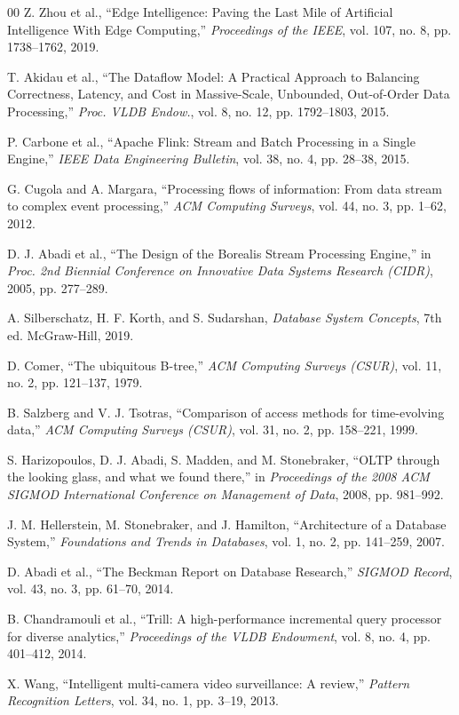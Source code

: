 \documentclass[conference]{IEEEtran}
\begin{document}
\begin{thebibliography}{00}
 Z. Zhou et al., ``Edge Intelligence: Paving the Last Mile of Artificial Intelligence With Edge Computing,'' \textit{Proceedings of the IEEE}, vol. 107, no. 8, pp. 1738--1762, 2019.

 T. Akidau et al., ``The Dataflow Model: A Practical Approach to Balancing Correctness, Latency, and Cost in Massive-Scale, Unbounded, Out-of-Order Data Processing,'' \textit{Proc. VLDB Endow.}, vol. 8, no. 12, pp. 1792--1803, 2015.

 P. Carbone et al., ``Apache Flink: Stream and Batch Processing in a Single Engine,'' \textit{IEEE Data Engineering Bulletin}, vol. 38, no. 4, pp. 28--38, 2015.

 G. Cugola and A. Margara, ``Processing flows of information: From data stream to complex event processing,'' \textit{ACM Computing Surveys}, vol. 44, no. 3, pp. 1--62, 2012.

 D. J. Abadi et al., ``The Design of the Borealis Stream Processing Engine,'' in \textit{Proc. 2nd Biennial Conference on Innovative Data Systems Research (CIDR)}, 2005, pp. 277--289.

 A. Silberschatz, H. F. Korth, and S. Sudarshan, \textit{Database System Concepts}, 7th ed. McGraw-Hill, 2019.

 D. Comer, ``The ubiquitous B-tree,'' \textit{ACM Computing Surveys (CSUR)}, vol. 11, no. 2, pp. 121--137, 1979.

 B. Salzberg and V. J. Tsotras, ``Comparison of access methods for time-evolving data,'' \textit{ACM Computing Surveys (CSUR)}, vol. 31, no. 2, pp. 158--221, 1999.

 S. Harizopoulos, D. J. Abadi, S. Madden, and M. Stonebraker, ``OLTP through the looking glass, and what we found there,'' in \textit{Proceedings of the 2008 ACM SIGMOD International Conference on Management of Data}, 2008, pp. 981--992.

 J. M. Hellerstein, M. Stonebraker, and J. Hamilton, ``Architecture of a Database System,'' \textit{Foundations and Trends in Databases}, vol. 1, no. 2, pp. 141--259, 2007.

 D. Abadi et al., ``The Beckman Report on Database Research,'' \textit{SIGMOD Record}, vol. 43, no. 3, pp. 61--70, 2014.

 B. Chandramouli et al., ``Trill: A high-performance incremental query processor for diverse analytics,'' \textit{Proceedings of the VLDB Endowment}, vol. 8, no. 4, pp. 401--412, 2014.

 X. Wang, ``Intelligent multi-camera video surveillance: A review,'' \textit{Pattern Recognition Letters}, vol. 34, no. 1, pp. 3--19, 2013.

\end{thebibliography}
\end{document}
